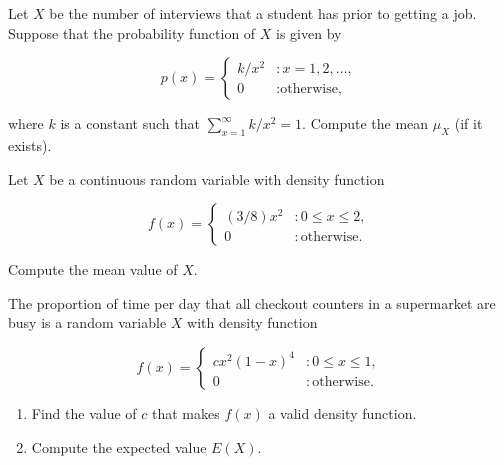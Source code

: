 \documentclass[12pt,reqno]{amsart}
\begin{document}
\newpage
\prob Let $X$ be the number of interviews that a student has prior to getting a job. Suppose that the probability function of $X$ is given by

	\[
	p(x) = \begin{cases}
	k/x^2 & : x=1,2,\ldots, \\
	0 & : \text{otherwise,}
	\end{cases}
	\]

where $k$ is a constant such that $\sum_{x=1}^\infty k/x^2 = 1$. Compute the mean $\mu_X$ (if it exists).\vfill



















\bigskip
\prob Let $X$ be a continuous random variable with density function
	
	\[
	f(x) = \begin{cases}
	(3/8)x^2 & : 0 \leq x \leq 2, \\
	0 & : \text{otherwise}.
	\end{cases}
	\]

Compute the mean value of $X$.\vfill














\bigskip
\prob The proportion of time per day that all checkout counters in a supermarket are busy is a random variable $X$ with density function

	\[
	f(x) = \begin{cases}
	cx^2(1-x)^4 & : 0 \leq x \leq 1, \\
	0 & : \text{otherwise}.
	\end{cases}
	\]

\medskip
\begin{enumerate}
\item Find the value of $c$ that makes $f(x)$ a valid density function.\vfill
\item Compute the expected value $E(X)$.\vfill
\end{enumerate}
\end{document}
